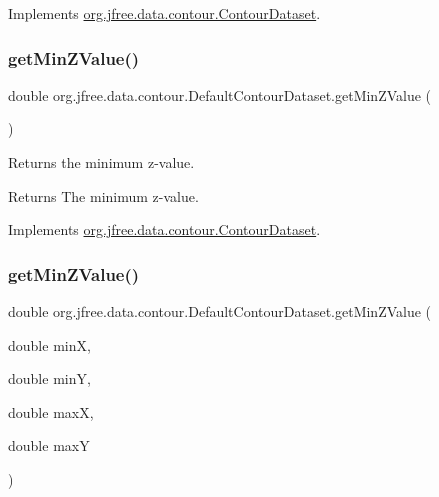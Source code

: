 Implements \mbox{\hyperlink{interfaceorg_1_1jfree_1_1data_1_1contour_1_1_contour_dataset_a660230892a67782a7a63c9357121344b}{org.\+jfree.\+data.\+contour.\+Contour\+Dataset}}.

\mbox{\label{classorg_1_1jfree_1_1data_1_1contour_1_1_default_contour_dataset_aab57c6d1cdd13d5574e3fd0170fce307}} 
\subsubsection{\texorpdfstring{get\+Min\+Z\+Value()}{getMinZValue()}\hspace{0.1cm}{\footnotesize\ttfamily [1/2]}}
{\footnotesize\ttfamily double org.\+jfree.\+data.\+contour.\+Default\+Contour\+Dataset.\+get\+Min\+Z\+Value (\begin{DoxyParamCaption}{ }\end{DoxyParamCaption})}

Returns the minimum z-\/value.

\begin{DoxyReturn}{Returns}
The minimum z-\/value. 
\end{DoxyReturn}


Implements \mbox{\hyperlink{interfaceorg_1_1jfree_1_1data_1_1contour_1_1_contour_dataset_a27f848473fb6c0a89c91ea9101fe2698}{org.\+jfree.\+data.\+contour.\+Contour\+Dataset}}.

\mbox{\label{classorg_1_1jfree_1_1data_1_1contour_1_1_default_contour_dataset_a75c88aa0192db75d737896d6882a05b1}} 
\subsubsection{\texorpdfstring{get\+Min\+Z\+Value()}{getMinZValue()}\hspace{0.1cm}{\footnotesize\ttfamily [2/2]}}
{\footnotesize\ttfamily double org.\+jfree.\+data.\+contour.\+Default\+Contour\+Dataset.\+get\+Min\+Z\+Value (\begin{DoxyParamCaption}\item[{double}]{minX,  }\item[{double}]{minY,  }\item[{double}]{maxX,  }\item[{double}]{maxY }\end{DoxyParamCaption})}

